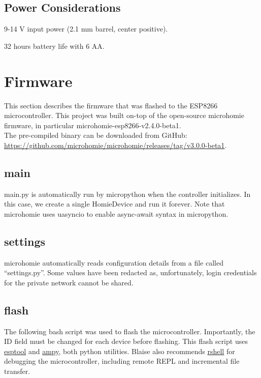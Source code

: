 \documentclass{manual}
\begin{document}


\subsection{Power Considerations}

9-14 V input power (2.1 mm barrel, center positive).

32 hours battery life with 6 AA.

\section{Firmware}

This section describes the firmware that was flashed to the ESP8266 microcontroller.
This project was built on-top of the open-source microhomie firmware, in particular microhomie-esp8266-v2.4.0-beta1. \\
The pre-compiled binary can be downloaded from GitHub: \\
\url{https://github.com/microhomie/microhomie/releases/tag/v3.0.0-beta1}.

\subsection{main}

main.py is automatically run by micropython when the controller initializes.
In this case, we create a single HomieDevice and run it forever.
Note that microhomie uses uasyncio to enable async-await syntax in micropython.


\clearpage
\subsection{settings}

microhomie automatically reads configuration details from a file called ``settings.py''.
Some values have been redacted as, unfortunately, login credentials for the private network cannot be shared.


\subsection{flash}

The following bash script was used to flash the microcontroller.
Importantly, the ID field must be changed for each device before flashing.
This flash script uses \href{https://github.com/espressif/esptool}{esptool} and \href{https://github.com/scientifichackers/ampy}{ampy}, both python utilities.
Blaise also recommends \href{https://github.com/dhylands/rshell}{rshell} for debugging the microcontroller, including remote REPL and incremental file transfer.
\end{document}
